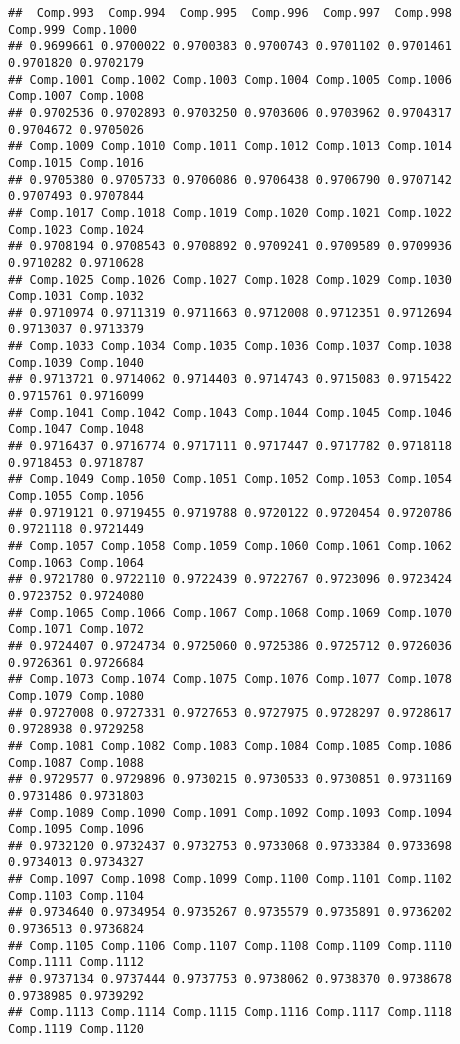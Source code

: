 \documentclass[
]{article}
\begin{document}
\begin{verbatim}
##  Comp.993  Comp.994  Comp.995  Comp.996  Comp.997  Comp.998  Comp.999 Comp.1000 
## 0.9699661 0.9700022 0.9700383 0.9700743 0.9701102 0.9701461 0.9701820 0.9702179 
## Comp.1001 Comp.1002 Comp.1003 Comp.1004 Comp.1005 Comp.1006 Comp.1007 Comp.1008 
## 0.9702536 0.9702893 0.9703250 0.9703606 0.9703962 0.9704317 0.9704672 0.9705026 
## Comp.1009 Comp.1010 Comp.1011 Comp.1012 Comp.1013 Comp.1014 Comp.1015 Comp.1016 
## 0.9705380 0.9705733 0.9706086 0.9706438 0.9706790 0.9707142 0.9707493 0.9707844 
## Comp.1017 Comp.1018 Comp.1019 Comp.1020 Comp.1021 Comp.1022 Comp.1023 Comp.1024 
## 0.9708194 0.9708543 0.9708892 0.9709241 0.9709589 0.9709936 0.9710282 0.9710628 
## Comp.1025 Comp.1026 Comp.1027 Comp.1028 Comp.1029 Comp.1030 Comp.1031 Comp.1032 
## 0.9710974 0.9711319 0.9711663 0.9712008 0.9712351 0.9712694 0.9713037 0.9713379 
## Comp.1033 Comp.1034 Comp.1035 Comp.1036 Comp.1037 Comp.1038 Comp.1039 Comp.1040 
## 0.9713721 0.9714062 0.9714403 0.9714743 0.9715083 0.9715422 0.9715761 0.9716099 
## Comp.1041 Comp.1042 Comp.1043 Comp.1044 Comp.1045 Comp.1046 Comp.1047 Comp.1048 
## 0.9716437 0.9716774 0.9717111 0.9717447 0.9717782 0.9718118 0.9718453 0.9718787 
## Comp.1049 Comp.1050 Comp.1051 Comp.1052 Comp.1053 Comp.1054 Comp.1055 Comp.1056 
## 0.9719121 0.9719455 0.9719788 0.9720122 0.9720454 0.9720786 0.9721118 0.9721449 
## Comp.1057 Comp.1058 Comp.1059 Comp.1060 Comp.1061 Comp.1062 Comp.1063 Comp.1064 
## 0.9721780 0.9722110 0.9722439 0.9722767 0.9723096 0.9723424 0.9723752 0.9724080 
## Comp.1065 Comp.1066 Comp.1067 Comp.1068 Comp.1069 Comp.1070 Comp.1071 Comp.1072 
## 0.9724407 0.9724734 0.9725060 0.9725386 0.9725712 0.9726036 0.9726361 0.9726684 
## Comp.1073 Comp.1074 Comp.1075 Comp.1076 Comp.1077 Comp.1078 Comp.1079 Comp.1080 
## 0.9727008 0.9727331 0.9727653 0.9727975 0.9728297 0.9728617 0.9728938 0.9729258 
## Comp.1081 Comp.1082 Comp.1083 Comp.1084 Comp.1085 Comp.1086 Comp.1087 Comp.1088 
## 0.9729577 0.9729896 0.9730215 0.9730533 0.9730851 0.9731169 0.9731486 0.9731803 
## Comp.1089 Comp.1090 Comp.1091 Comp.1092 Comp.1093 Comp.1094 Comp.1095 Comp.1096 
## 0.9732120 0.9732437 0.9732753 0.9733068 0.9733384 0.9733698 0.9734013 0.9734327 
## Comp.1097 Comp.1098 Comp.1099 Comp.1100 Comp.1101 Comp.1102 Comp.1103 Comp.1104 
## 0.9734640 0.9734954 0.9735267 0.9735579 0.9735891 0.9736202 0.9736513 0.9736824 
## Comp.1105 Comp.1106 Comp.1107 Comp.1108 Comp.1109 Comp.1110 Comp.1111 Comp.1112 
## 0.9737134 0.9737444 0.9737753 0.9738062 0.9738370 0.9738678 0.9738985 0.9739292 
## Comp.1113 Comp.1114 Comp.1115 Comp.1116 Comp.1117 Comp.1118 Comp.1119 Comp.1120 

\end{verbatim}
\end{document}
